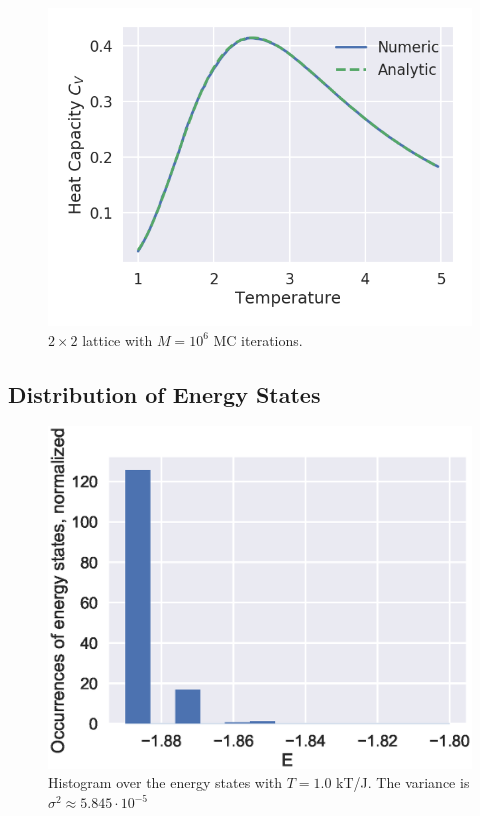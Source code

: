 \documentclass[aps,reprint]{revtex4-1}
\begin{document}
\begin{figure}[H]
  \centering
  \includegraphics[width=\columnwidth]{figures/L2Ne6.png}
  \caption{$2 \times 2$ lattice with $M = 10^6$ MC iterations.}
  \label{fig:L2Ne6}
\end{figure}


\subsection{Distribution of Energy States}
\label{sec:distr-energy-stat}

\begin{figure}[H]
  \centering
  \includegraphics[width=\columnwidth]{figures/4da.eps}
  \caption{\label{fig:4da} Histogram over the energy states with \(T=1.0\) kT/J.
  The variance is \(\sigma^{2} \approx 5.845\cdot 10^{-5}\)}
\end{figure}
\end{document}
